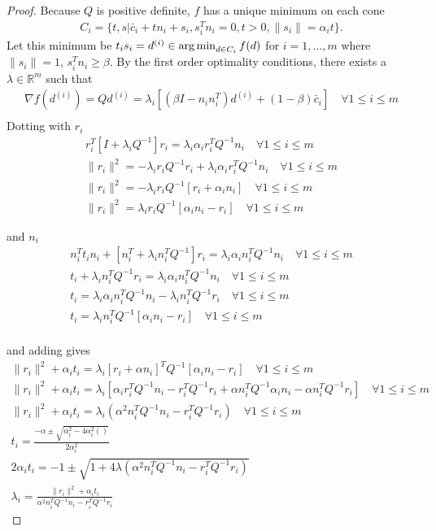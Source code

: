 \begin{proof}
\color{red}
Because $Q$ is positive definite, $f$ has a unique minimum on each cone 
\begin{align*}
C_i = \{ t, s | \bar c_i + tn_i + s_i, s_i^Tn_i = 0, t>0, \|s_i\| = \alpha_i t \}.
\end{align*}
\color{black}
Let this minimum be $t_i s_i = d^{(i)} \in \operatorname*{arg\,min}_{d \in C_i} f(d)$ for $i=1,\ldots,m$ where $\|s_i\| = 1$, $s_i^Tn_i \ge \beta$.
By the first order optimality conditions, there exists a $\lambda \in \mathbb R^m$ such that
\begin{align*}
\nabla f(d^{(i)}) = Q d^{(i)} = \lambda_i \left[(\beta I - n_i n_i^T) d^{(i)} + (1 - \beta) \bar c_i \right]\quad \forall 1\le i\le m \\
\end{align*}
Dotting with $r_i$
\begin{align*}
r_i^T\left[I + \lambda_i Q^{-1}\right]r_i = \lambda_i\alpha_i r_i^TQ^{-1} n_i \quad \forall 1\le i\le m \\
\|r_i\|^2 = - \lambda_ir_i Q^{-1}r_i + \lambda_i\alpha_i r_i^TQ^{-1} n_i \quad \forall 1\le i\le m \\
\|r_i\|^2 = - \lambda_ir_i Q^{-1}\left[r_i + \alpha_i n_i\right] \quad \forall 1\le i\le m \\
\|r_i\|^2 = \lambda_ir_i Q^{-1}\left[\alpha_i n_i - r_i\right] \quad \forall 1\le i\le m
\end{align*}

and $n_i$
\begin{align*}
n_i^Tt_in_i + \left[n_i^T + \lambda_i n_i^TQ^{-1}\right]r_i = \lambda_i\alpha_i n_i^TQ^{-1} n_i \quad \forall 1\le i\le m \\
t_i + \lambda_i n_i^TQ^{-1}r_i = \lambda_i\alpha_i n_i^TQ^{-1} n_i \quad \forall 1\le i\le m \\
t_i = \lambda_i\alpha_i n_i^TQ^{-1} n_i - \lambda_i n_i^TQ^{-1}r_i \quad \forall 1\le i\le m \\
t_i = \lambda_in_i^TQ^{-1}\left[\alpha_i n_i - r_i\right] \quad \forall 1\le i\le m \\
\end{align*}

and adding gives
\begin{align*}
\|r_i\|^2  + \alpha_i t_i = \lambda_i\left[r_i + \alpha n_i\right]^TQ^{-1}\left[\alpha_i n_i - r_i\right] \quad \forall 1\le i\le m \\
\|r_i\|^2  + \alpha_i t_i = \lambda_i\left[ \alpha_ir_i^T Q^{-1} n_i - r_i^T Q^{-1}r_i  + \alpha n_i^TQ^{-1}\alpha_i n_i - \alpha n_i^TQ^{-1}r_i   \right] \quad \forall 1\le i\le m \\
\|r_i\|^2  + \alpha_i t_i = \lambda_i\left(\alpha^2 n_i^TQ^{-1} n_i - r_i^T Q^{-1}r_i  \right) \quad \forall 1\le i\le m \\
t_i = \frac{-\alpha \pm \sqrt{\alpha_i^2 - 4\alpha_i^2()}}{2\alpha_i^2} \\
2\alpha_it_i = -1 \pm \sqrt{1 + 4\lambda(\alpha^2 n_i^TQ^{-1} n_i - r_i^T Q^{-1}r_i)} \\
\lambda_i = \frac{\|r_i\|^2  + \alpha_i t_i}{\alpha^2 n_i^TQ^{-1} n_i - r_i^T Q^{-1}r_i}
\end{align*}


\end{proof}
